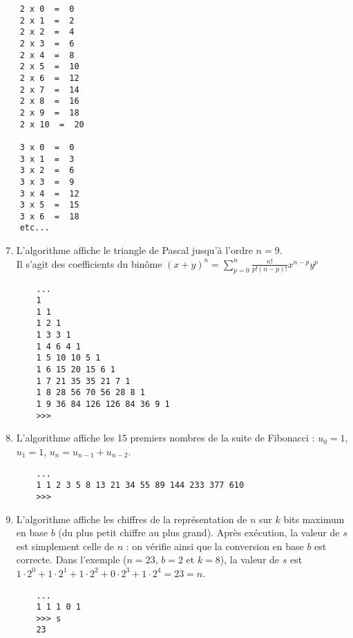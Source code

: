 \begin{description}
\begin{minipage}[t]{7.5cm}
\begin{enumerate}
\begin{py}{12cm}
\begin{verbatim}
	2 x 0  =  0
	2 x 1  =  2
	2 x 2  =  4
	2 x 3  =  6
	2 x 4  =  8
	2 x 5  =  10
	2 x 6  =  12
	2 x 7  =  14
	2 x 8  =  16
	2 x 9  =  18
	2 x 10  =  20

	3 x 0  =  0
	3 x 1  =  3
	3 x 2  =  6
	3 x 3  =  9
	3 x 4  =  12
	3 x 5  =  15
	3 x 6  =  18
	etc...
	\end{verbatim}
	\end{py}
	\end{enumerate}
	\end{minipage}
	\hfill
	\begin{minipage}[t]{7.5cm}
	\begin{enumerate}\setcounter{enumi}{6}
	
	\item L'algorithme affiche le triangle de Pascal jusqu'à l'ordre $n = 9$.\\
		Il s'agit des coefficients du binôme $\displaystyle (x+y)^n = \sum_{p=0}^n \frac{n!}{p!(n-p)!}x^{n-p}y^{p}$


	\begin{py}{12cm}
	\begin{verbatim}
	...
	1
	1 1
	1 2 1
	1 3 3 1
	1 4 6 4 1
	1 5 10 10 5 1
	1 6 15 20 15 6 1
	1 7 21 35 35 21 7 1
	1 8 28 56 70 56 28 8 1
	1 9 36 84 126 126 84 36 9 1
	>>> 
	\end{verbatim}
	\end{py}

	 \item  L'algorithme affiche les 15 premiers nombres de la suite de
 		Fibonacci : $u_0=1$, $u_1=1$, $u_n = u_{n-1} + u_{n-2}$.

	\begin{py}{12cm}
	\begin{verbatim}
	... 
	1 1 2 3 5 8 13 21 34 55 89 144 233 377 610
	>>> 
	\end{verbatim}
	\end{py}

	\item L'algorithme affiche les chiffres de la représentation de $n$ sur $k$ bits maximum
		en base $b$ (du plus petit chiffre au plus grand). Après exécution, la valeur de $s$
		est simplement celle de $n$ : on vérifie ainsi que la conversion en base $b$ est correcte.
		Dans l'exemple ($n=23$, $b=2$ et $k=8$), la valeur de $s$ est 
		$1\cdot 2^0 + 1\cdot 2^1 + 1\cdot 2^2 + 0\cdot 2^3 + 1\cdot 2^4 = 23 = n$.

	\begin{py}{12cm}
	\begin{verbatim}
	... 
	1 1 1 0 1
	>>> s
	23
	\end{verbatim}
	\end{py}
	\end{enumerate}
	\end{minipage}



\end{description}
